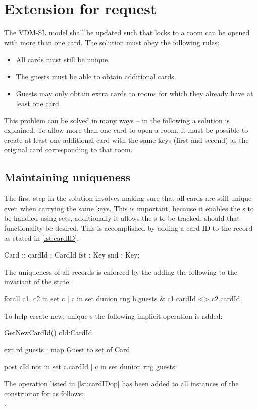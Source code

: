 \documentclass[Main]{subfiles}
\begin{document}
\section{Extension for request}

The VDM-SL model shall be updated such that locks to a room can be opened with more than one card.
The solution must obey the following rules:
\begin{itemize}
\item All cards must still be unique.
\item The guests must be able to obtain additional cards.
\item Guests may only obtain extra cards to rooms for which they already have at least one card.
\end{itemize}
This problem can be solved in many ways -- in the following a solution is explained.
To allow more than one card to open a room, it must be possible to create at least one additional card with the same keys (first and second) as the original card corresponding to that room.

\subsection{Maintaining  uniqueness}

The first step in the solution involves making sure that all cards are still unique even when carrying the same keys. This is important, because it enables the s to be handled using sets, additionally it allows the s to be tracked, should that functionality be desired. 
This is accomplished by adding a card ID to the  record as stated in \codeTitle \ref{lst:cardID}.

\begin{vdmsl}[label=lst:cardID,caption= \code{Card} with ID ]
Card ::	cardId 	 : CardId
				fst 	   : Key  
				snd 	   : Key; 
\end{vdmsl}
The uniqueness of all  records is enforced by the adding the following to the invariant of the  state:

\begin{vdmsl}[label=lst:hotelInv,caption= Invariant added to \code{Hotel} ]
forall c1, c2 in set {c | c in set dunion rng h.guests} & c1.cardId <> c2.cardId
\end{vdmsl}
To help create new, unique s the following implicit operation is added:

\begin{vdmsl}[label=lst:cardIDop,caption= Helper operation for unique \code{CardId}s ]
GetNewCardId() cId:CardId

ext rd guests : map Guest to set of Card

post cId not in set {c.cardId | c in set dunion rng guests};
\end{vdmsl}
The operation listed in \codeTitle \ref{lst:cardIDop} has been added to all instances of the constructor for  as follows:
\\ .
\end{document}
